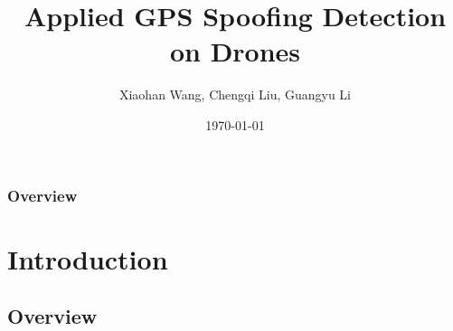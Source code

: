 \documentclass[aspectratio=169, 8pt]{beamer}
\title[Short Title]{Applied GPS Spoofing Detection on Drones} %
\author{Xiaohan Wang, Chengqi Liu, Guangyu Li} %
\institute[TU Eindhoven] %
{
TU Eindhoven \\ %
\medskip%
}
\date{\today} %
\begin{document}
\begin{frame}
\titlepage %
\end{frame}

\begin{frame}
\frametitle{Overview} %
\tableofcontents %
\end{frame}







\section{Introduction} %

\subsection{Overview} 
\end{document}
